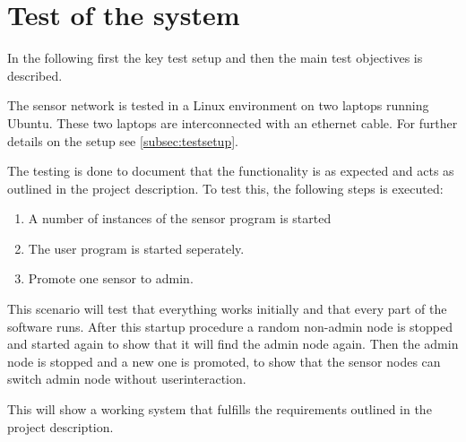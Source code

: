 \section{Test of the system}
\label{sec:testing}
In the following first the key test setup and then the main test objectives is described.

The sensor network is tested in a Linux environment on two laptops running Ubuntu. These two laptops are interconnected with an ethernet cable. For further details on the setup see \ref{subsec:testsetup}.

The testing is done to document that the functionality is as expected and acts as outlined in the project description. To test this, the following steps is executed:
\begin{enumerate}
    \item A number of instances of the sensor program is started
    \item The user program is started seperately.
    \item Promote one sensor to admin.
\end{enumerate}
This scenario will test that everything works initially and that every part of the software runs. 
After this startup procedure a random non-admin node is stopped and started again to show that it will find the admin node again. Then the admin node is stopped and a new one is promoted, to show that the sensor nodes can switch admin node without userinteraction.

This will show a working system that fulfills the requirements outlined in the project description.

